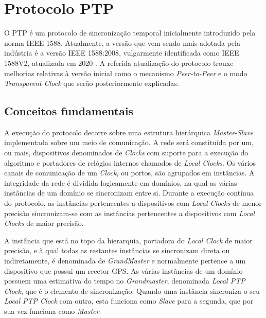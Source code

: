 
\chapter{Protocolo PTP}
\label{chapter:background}

O PTP é um protocolo de sincronização temporal inicialmente introduzido pela norma IEEE 1588. Atualmente, a versão que vem sendo mais adotada pela indústria é a versão IEEE 1588:2008, vulgarmente identificada como IEEE 1588V2, atualizada em 2020 \cite{PTP}.
A referida atualização do protocolo trouxe melhorias relativas à versão inicial como o mecanismo \textit{Peer-to-Peer} e o modo \textit{Transparent Clock} que serão posteriormente explicadas. 


\section{Conceitos fundamentais}
\label{section:overview}

A execução do protocolo decorre sobre uma estrutura hierárquica \textit{Master}-\textit{Slave} implementada sobre um meio de comunicação. A rede será constituída por um, ou mais, dispositivos denominados de \textit{Clocks} com suporte para a execução do algoritmo e portadores de relógios internos chamados de \textit{Local Clocks}. Os vários canais de comunicação de um \textit{Clock}, ou portos, são agrupados em instâncias. A integridade da rede é dividida logicamente em domínios, na qual as várias instâncias de um domínio se sincronizam entre si.  Durante a execução contínua do protocolo, as instâncias pertencentes a dispositivos com \textit{Local Clocks} de menor precisão sincronizam-se com as instâncias pertencentes a dispositivos com \textit{Local Clocks} de maior precisão. \par  A instância que está no topo da hierarquia, portadora do \textit{Local Clock} de maior precisão, e à qual todas as restantes instâncias se sincronizam direta ou indiretamente, é denominada de \textit{GrandMaster} e normalmente pertence a um dispositivo que possui um recetor GPS. As várias instâncias de um domínio possuem uma estimativa do tempo no \textit{Grandmaster}, denominada \textit{Local PTP Clock}, que é o elemento de sincronização. Quando uma instância sincroniza o seu \textit{Local PTP Clock} com outra, esta funciona como \textit{Slave} para a segunda, que por sua vez funciona como \textit{Master}.


